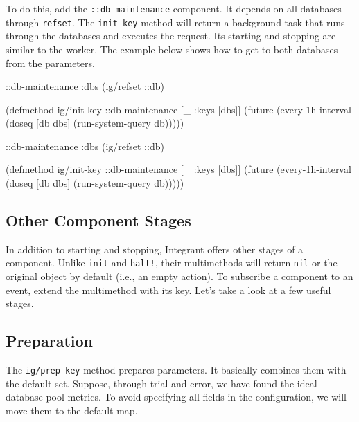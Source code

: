To do this, add the \texttt{::db-main\-te\-nance} component. It depends on all databases through \verb|refset|. The \verb|init-key| method will return a background task that runs through the databases and executes the request. Its starting and stopping are similar to the worker. The example below shows how to get to both databases from the parameters.

\ifnarrow

\begin{english}
  \begin{clojure}
{::db-maintenance
 {:dbs (ig/refset ::db)}}

(defmethod ig/init-key ::db-maintenance
  [_ {:keys [dbs]}]
  (future
    (every-1h-interval
      (doseq [db dbs]
        (run-system-query db)))))
  \end{clojure}
\end{english}

\else

\begin{english}
  \begin{clojure}
{::db-maintenance {:dbs (ig/refset ::db)}}

(defmethod ig/init-key ::db-maintenance
  [_ {:keys [dbs]}]
  (future
    (every-1h-interval
      (doseq [db dbs]
        (run-system-query db)))))
  \end{clojure}
\end{english}

\fi

\subsection{Other Component Stages}


In addition to starting and stopping, Integrant offers other stages of a component. Unlike \verb|init| and \verb|halt!|, their multimethods will return \verb|nil| or the original object by default (i.e., an empty action). To subscribe a component to an event, extend the multimethod with its key. Let's take a look at a few useful stages.

\subsection{Preparation}

The \verb|ig/prep-key| method prepares parameters. It basically combines them with the default set. Suppose, through trial and error, we have found the ideal database pool metrics. To avoid specifying all fields in the configuration, we will move them to the default map.

